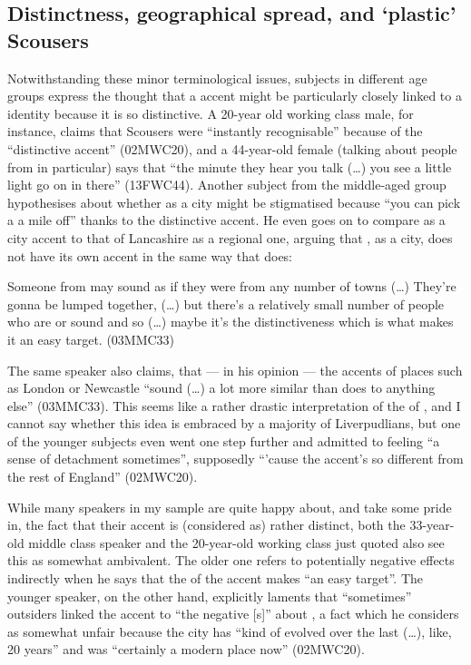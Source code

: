 \subsection{Distinctness, geographical spread, and `plastic' Scousers}

Notwithstanding these minor terminological issues, subjects in different age groups express the thought that a  accent might be particularly closely linked to a  identity because it is so distinctive.
A 20-year old working class male, for instance, claims that Scousers were ``instantly recognisable'' because of the ``distinctive accent'' (02MWC20), and a 44-year-old female (talking about people from  in particular) says that ``the minute they hear you talk (\ldots) you see a little light go on in there'' (13FWC44).
Another subject from the middle-aged group hypothesises about whether  as a city might be stigmatised because ``you can pick a  a mile off'' thanks to the distinctive accent.
He even goes on to compare  as a city accent to that of Lancashire as a regional one, arguing that , as a city, does not have its own accent in the same way that  does:

\begin{example}
	Someone from  may sound as if they were from any number of towns (\ldots) They're gonna be lumped together, (\ldots) but there's a relatively small number of people who are  or sound  and so (\ldots) maybe it's the distinctiveness which is what makes it an easy target. (03MMC33)
\end{example}

The same speaker also claims, that --- in his opinion --- the accents of places such as London or Newcastle ``sound (\ldots) a lot more similar than  does to anything else'' (03MMC33).
This seems like a rather drastic interpretation of the  of , and I cannot say whether this idea is embraced by a majority of Liverpudlians, but one of the younger subjects even went one step further and admitted to feeling ``a sense of detachment sometimes'', supposedly ``'cause the accent's so different from the rest of England'' (02MWC20).

While many speakers in my sample are quite happy about, and take some pride in, the fact that their accent is (considered as) rather distinct, both the 33-year-old middle class speaker and the 20-year-old working class  just quoted also see this  as somewhat ambivalent.
The older one refers to potentially negative effects indirectly when he says that the  of the accent makes  ``an easy target''.
The younger speaker, on the other hand, explicitly laments that ``sometimes'' outsiders linked the accent to ``the negative [s]'' about , a fact which he considers as somewhat unfair because the city has ``kind of evolved over the last (\ldots), like, 20 years'' and was ``certainly a modern place now'' (02MWC20).

